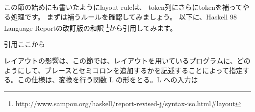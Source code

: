 \documentclass[mingoth,a4paper]{jsarticle}
\begin{document}
この節の始めにも書いたようにlayout ruleは、
token列にさらにtokenを補ってやる処理です。
まずは補うルールを確認してみましょう。
以下に、Haskell 98 Language Reportの改訂版の和訳
\footnote{http://www.sampou.org/haskell/report-revised-j/syntax-iso.html\#layout}から引用してみます。


\dotfill 引用ここから\dotfill


 レイアウトの影響は、この節では、レイアウトを用いているプログラムに、どのようにして、ブレースとセミコロンを追加するかを記述することによって指定する。この仕様は、変換を行う関数 L の形をとる。L  への入力は
\end{document}
